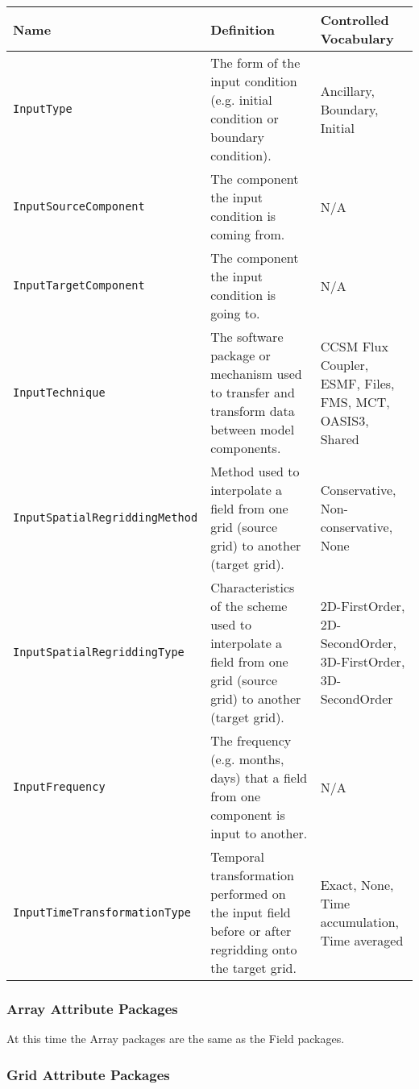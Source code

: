 \begin{tabular}{|p{8cm}|p{20cm}|p{10cm}|}
    {\bf Name} & {\bf Definition} & {\bf Controlled Vocabulary} \\
    \hline\hline
    {\tt InputType} & The form of the input condition (e.g. initial condition or boundary condition). &  Ancillary, Boundary, Initial\\
    {\tt InputSourceComponent} & The component the input condition is coming from. & N/A \\ 
    {\tt InputTargetComponent} & The component the input condition is going to. & N/A \\ 
    {\tt InputTechnique} & The software package or mechanism used to transfer and transform data between model components. & CCSM Flux Coupler, ESMF, Files, FMS, MCT, OASIS3, Shared\\ 
    {\tt InputSpatialRegriddingMethod} & Method used to interpolate a field from one grid (source grid) to another (target grid). & Conservative, Non-conservative, None\\ 
    {\tt InputSpatialRegriddingType} & Characteristics of the scheme used to interpolate a field from one grid (source grid) to another (target grid).& 2D-FirstOrder, 2D-SecondOrder, 3D-FirstOrder, 3D-SecondOrder\\ 
    {\tt InputFrequency} & The frequency (e.g. months, days) that a field from one component is input
 to another. & N/A\\ 
    {\tt InputTimeTransformationType} & Temporal transformation performed on the input field before or after regridding onto the target grid.& Exact, None, Time accumulation, Time averaged\\ 
\end{tabular}




\vspace{.25in}
\subsubsection{Array Attribute Packages}
\label{ArrayAttributePackages}

At this time the Array packages are the same as the Field packages.


\vspace{.25in}
\subsubsection{Grid Attribute Packages}
\label{GridAttributePackages}

